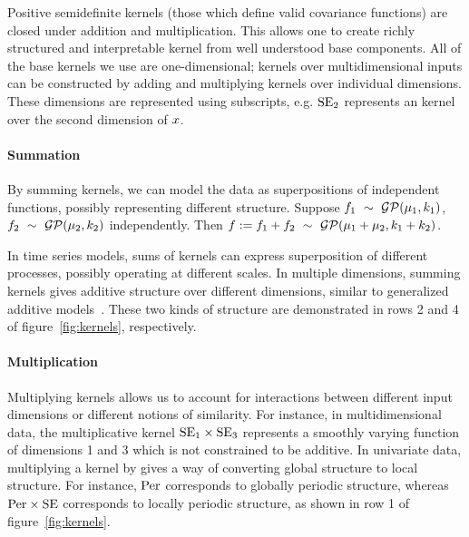 \documentclass[twoside]{article}
\begin{document}
Positive semidefinite kernels (\ie those which define valid covariance functions) are closed under addition and multiplication.
This allows one to create richly structured and interpretable kernel from well understood base components.
All of the base kernels we use are one-dimensional; kernels over multidimensional inputs can be constructed by adding and multiplying kernels over individual dimensions.
These dimensions are represented using subscripts, e.g. $\textrm{SE}_2$ represents an \kSE{} kernel over the second dimension of $x$.
%


\paragraph{Summation}

By summing kernels, we can model the data as superpositions of independent functions, possibly representing different structure.
Suppose ${f_1 \ \sim\  \mathcal{GP}(\mu_1, k_1)}$, ${f_2 \ \sim\  \mathcal{GP}(\mu_2, k_2)}$ independently.
Then ${f := f_1 + f_2 \ \sim\  \mathcal{GP}(\mu_1 + \mu_2, k_1 + k_2)}$.

In time series models, sums of kernels can express superposition of different processes, possibly operating at different scales.
In multiple dimensions, summing kernels gives additive structure over different dimensions, similar to generalized additive models~\citep{hastie1990generalized}.
These two kinds of structure are demonstrated in rows 2 and 4 of figure~\ref{fig:kernels}, respectively.


\paragraph{Multiplication}

Multiplying kernels allows us to account for interactions between different input dimensions or different notions of similarity. 
For instance, in multidimensional data, the multiplicative kernel $\textrm{SE}_1 \times \textrm{SE}_3$ represents a smoothly varying function of dimensions 1 and 3 which is not constrained to be additive.
In univariate data, multiplying a kernel by \kSE{} gives a way of converting global structure to local structure. 
For instance, $\textrm{Per}$ corresponds to globally periodic structure, whereas $\textrm{Per} \times \textrm{SE}$ corresponds to locally periodic structure, as shown in row 1 of figure~\ref{fig:kernels}.
\end{document}
